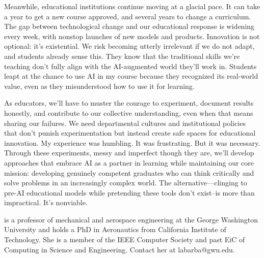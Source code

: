 \documentclass{tufte-handout}
\begin{document}
Meanwhile, educational institutions continue moving at a glacial pace. It can take a year to get a new course approved, and several years to change a curriculum. The gap between technological change and our educational response is widening every week, with nonstop launches of new models and products. Innovation is not optional: it’s existential. We risk becoming utterly irrelevant if we do not adapt, and students already sense this. They know that the traditional skills we're teaching don't fully align with the AI-augmented world they'll work in. Students leapt at the chance to use AI in my course because they recognized its real-world value, even as they misunderstood how to use it for learning.

As educators, we’ll have to muster the courage to experiment, document results honestly, and contribute to our collective understanding, even when that means sharing our failures. We need departmental cultures and institutional policies that don't punish experimentation but instead create safe spaces for educational innovation.
My experience was humbling. It was frustrating. But it was necessary. Through these experiments, messy and imperfect though they are, we'll develop approaches that embrace AI as a partner in learning while maintaining our core mission: developing genuinely competent graduates who can think critically and solve problems in an increasingly complex world. The alternative---clinging to pre-AI educational models while pretending these tools don't exist--is more than impractical. It's nonviable.





 is a professor of mechanical and aerospace engineering at the George Washington University and holds a PhD in Aeronautics from California Institute of Technology. She is a member of the IEEE Computer Society and past EiC of Computing in Science and Engineering. Contact her at labarba@gwu.edu.
\end{document}
